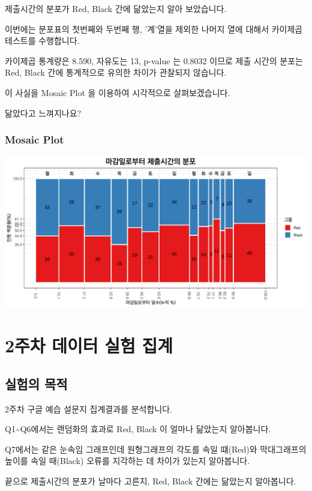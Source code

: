 \documentclass[
]{book}
\begin{document}
제출시간의 분포가 Red, Black 간에 닮았는지 알아 보았습니다.

이번에는 분포표의 첫번째와 두번째 행, '계'열을 제외한 나머지 열에 대해서 카이제곱테스트를 수행합니다.

카이제곱 통계량은 8.590, 자유도는 13, p-value 는 0.8032 이므로 제출 시간의 분포는 Red, Black 간에 통계적으로 유의한 차이가 관찰되지 않습니다.

이 사실을 Mosaic Plot 을 이용하여 시각적으로 살펴보겠습니다.

닮았다고 느껴지나요?

\subsection{Mosaic Plot}\label{mosaic-plot-1}

\includegraphics{Quiz_report_2025_files/figure-latex/unnamed-chunk-20-1.pdf}

\chapter{2주차 데이터 실험 집계}\label{uxc8fcuxcc28-uxb370uxc774uxd130-uxc2e4uxd5d8-uxc9d1uxacc4-1}

\section{실험의 목적}\label{uxc2e4uxd5d8uxc758-uxbaa9uxc801-1}

2주차 구글 예습 설문지 집계결과를 분석합니다.

Q1\textasciitilde Q6에서는 랜덤화의 효과로 Red, Black 이 얼마나 닮았는지 알아봅니다.

Q7에서는 같은 눈속임 그래프인데 원형그래프의 각도를 속일 떄(Red)와 막대그래프의 높이를 속일 때(Black) 오류를 지각하는 데 차이가 있는지 알아봅니다.

끝으로 제출시간의 분포가 날마다 고른지, Red, Black 간에는 닮았는지 알아봅니다.
\end{document}
